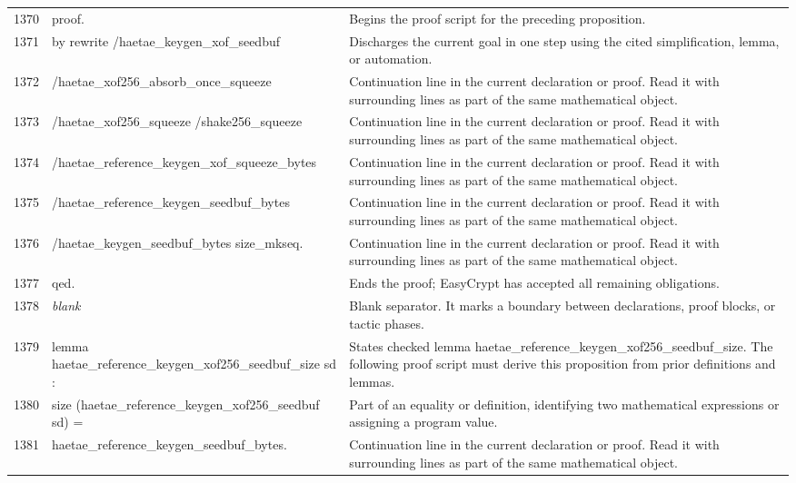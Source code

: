 \documentclass[10pt]{article}
\begin{document}
\begin{longtable}{r L{0.53\textwidth} L{0.37\textwidth}}
1370 & {\ttfamily\scriptsize proof.} & Begins the proof script for the preceding proposition. \\
1371 & {\ttfamily\scriptsize by rewrite /haetae\_keygen\_xof\_seedbuf} & Discharges the current goal in one step using the cited simplification, lemma, or automation. \\
1372 & {\ttfamily\scriptsize            /haetae\_xof256\_absorb\_once\_squeeze} & Continuation line in the current declaration or proof.  Read it with surrounding lines as part of the same mathematical object. \\
1373 & {\ttfamily\scriptsize            /haetae\_xof256\_squeeze /shake256\_squeeze} & Continuation line in the current declaration or proof.  Read it with surrounding lines as part of the same mathematical object. \\
1374 & {\ttfamily\scriptsize            /haetae\_reference\_keygen\_xof\_squeeze\_bytes} & Continuation line in the current declaration or proof.  Read it with surrounding lines as part of the same mathematical object. \\
1375 & {\ttfamily\scriptsize            /haetae\_reference\_keygen\_seedbuf\_bytes} & Continuation line in the current declaration or proof.  Read it with surrounding lines as part of the same mathematical object. \\
1376 & {\ttfamily\scriptsize            /haetae\_keygen\_seedbuf\_bytes size\_mkseq.} & Continuation line in the current declaration or proof.  Read it with surrounding lines as part of the same mathematical object. \\
1377 & {\ttfamily\scriptsize qed.} & Ends the proof; EasyCrypt has accepted all remaining obligations. \\
1378 & {\ttfamily\scriptsize \emph{blank}} & Blank separator.  It marks a boundary between declarations, proof blocks, or tactic phases. \\
1379 & {\ttfamily\scriptsize lemma haetae\_reference\_keygen\_xof256\_seedbuf\_size sd :} & States checked lemma haetae\_reference\_keygen\_xof256\_seedbuf\_size.  The following proof script must derive this proposition from prior definitions and lemmas. \\
1380 & {\ttfamily\scriptsize   size (haetae\_reference\_keygen\_xof256\_seedbuf sd) =} & Part of an equality or definition, identifying two mathematical expressions or assigning a program value. \\
1381 & {\ttfamily\scriptsize   haetae\_reference\_keygen\_seedbuf\_bytes.} & Continuation line in the current declaration or proof.  Read it with surrounding lines as part of the same mathematical object. \\

\end{longtable}
\end{document}
